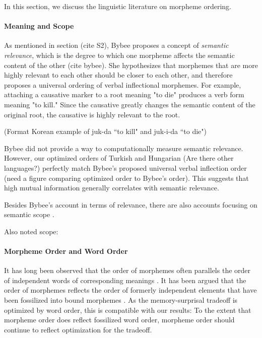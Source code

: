 \documentclass[11pt,letterpaper]{article}
\newcommand\becky[1]{{\color{blue}(#1)}}
\begin{document}

In this section, we discuss the linguistic literature on morpheme ordering.

\paragraph{Meaning and Scope}
As mentioned in section \becky{cite S2}, Bybee proposes a concept of \textit{semantic relevance}, which is the degree to which one morpheme affects the semantic content of the other \becky{cite bybee}. She hypothesizes that morphemes that are more highly relevant to each other should be closer to each other, and therefore proposes a universal ordering of verbal inflectional morphemes. For example, attaching a causative marker to a root meaning "to die" produces a verb form meaning "to kill." Since the causative greatly changes the semantic content of the original root, the causative is highly relevant to the root. 

\becky{Format Korean example of juk-da ``to kill" and juk-i-da ``to die"}

Bybee did not provide a way to computationally measure semantic relevance. However, our optimized orders of Turkish and Hungarian \becky{Are there other languages?} perfectly match Bybee's proposed universal verbal inflection order \becky{need a figure comparing optimized order to Bybee's order}. This suggests that high mutual information generally correlates with semantic relevance. 

Besides Bybee's account in terms of relevance, there are also accounts focusing on semantic scope \citep{rice2000morpheme}.

Also noted scope: \citep{baker1988incorporation,foley1984functional,chierchia1990meaning,valin1992a}



\paragraph{Morpheme Order and Word Order}
It has long been observed that the order of morphemes often parallels the order of independent words of corresponding meanings \citep{givon1971historical,venneman1973explanation,baker1985the}.
It has been argued that the order of morphemes reflects the order of formerly independent elements that have been fossilized into bound morphemes \citet{givon1971historical,venneman1973explanation}.
As the memory-surprisal tradeoff is optimized by word order, this is compatible with our results:
To the extent that morpheme order does reflect fossilized word order, morpheme order should continue to reflect optimization for the tradeoff.
\end{document}
